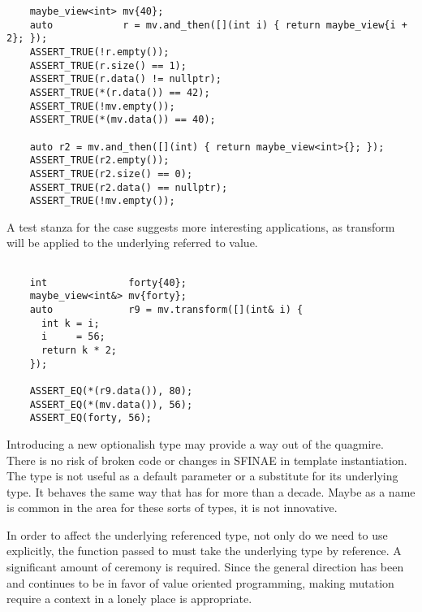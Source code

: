 \documentclass[a4paper,10pt,oneside,openany,final,article]{memoir}
\begin{document}
\begin{minipage}[t]{\linewidth}
  \begin{verbatim}
    maybe_view<int> mv{40};
    auto            r = mv.and_then([](int i) { return maybe_view{i + 2}; });
    ASSERT_TRUE(!r.empty());
    ASSERT_TRUE(r.size() == 1);
    ASSERT_TRUE(r.data() != nullptr);
    ASSERT_TRUE(*(r.data()) == 42);
    ASSERT_TRUE(!mv.empty());
    ASSERT_TRUE(*(mv.data()) == 40);

    auto r2 = mv.and_then([](int) { return maybe_view<int>{}; });
    ASSERT_TRUE(r2.empty());
    ASSERT_TRUE(r2.size() == 0);
    ASSERT_TRUE(r2.data() == nullptr);
    ASSERT_TRUE(!mv.empty());

  \end{verbatim}
\end{minipage}

A test stanza for the  case suggests more interesting applications, as transform will be applied to the underlying referred to value.

\begin{minipage}[t]{\linewidth}
  \begin{verbatim}

    int              forty{40};
    maybe_view<int&> mv{forty};
    auto             r9 = mv.transform([](int& i) {
      int k = i;
      i     = 56;
      return k * 2;
    });

    ASSERT_EQ(*(r9.data()), 80);
    ASSERT_EQ(*(mv.data()), 56);
    ASSERT_EQ(forty, 56);

  \end{verbatim}
\end{minipage}

Introducing a new optionalish type may provide a way out of the  quagmire. There is no risk of broken code or changes in SFINAE in template instantiation. The type  is not useful as a default parameter or a substitute for its underlying type. It behaves the same way that  has for more than a decade. Maybe as a name is common in the area for these sorts of types, it is not innovative.

In order to affect the underlying referenced type, not only do we need to use  explicitly, the function passed to  must take the underlying type by reference. A significant amount of ceremony is required. Since the general direction has been and continues to be in favor of value oriented programming, making mutation require a context in a lonely place is appropriate.
\end{document}
